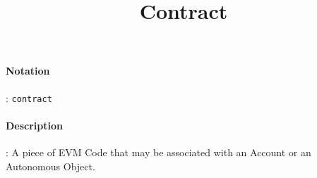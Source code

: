 \documentclass[10pt,a4paper,oneside]{scrartcl}
\author{}
\title{Contract}
\date{}
\begin{document}
\maketitle
\paragraph{Notation}: \texttt{contract}
\paragraph{Description}: A piece of EVM Code that may be associated with an Account or an Autonomous Object. 
\end{document}
